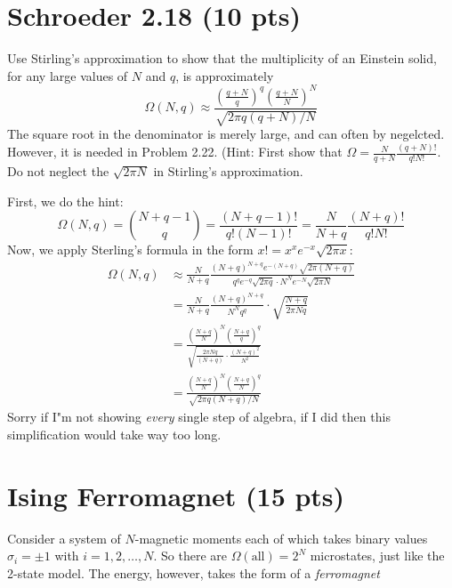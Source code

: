 \documentclass[10pt]{article}
\begin{document}
	\pagebreak

	\section*{Schroeder 2.18 (10 pts)}
	Use Stirling's approximation to show that the multiplicity of an Einstein solid, for any large values of $N$
	and $q$, is approximately
	\[
		\Omega(N, q) \approx \frac{\left( \frac{q + N}{q} \right)^q \left( \frac{q + N}{N} \right)^N}
		{\sqrt{2 \pi q(q + N) / N} }
	\] 
	The square root in the denominator is merely large, and can often by negelcted. However, it is needed 
	in Problem 2.22. (Hint: First show that $\Omega = \frac{N}{q + N}\frac{(q + N)!}{q! N!}$. Do not 
	neglect the $\sqrt{2\pi N} $ in Stirling's approximation.

	\begin{solution}
		First, we do the hint:
		\[
			\Omega(N, q) = {N + q - 1 \choose q} = \frac{(N + q - 1)!}{q!(N-1)!} = \frac{N}{N + q}
			\frac{(N + q)!}{q! N!}
		\] 
		Now, we apply Sterling's formula in the form $x! = x^xe^{-x}\sqrt{2\pi x}$:
		\begin{align*}
			\Omega(N, q) &\approx \frac{N}{N+q}\frac{(N + q)^{N + q} e^{-(N + q)} \sqrt{2 \pi (N + q)}}{q^q
			e^{-q} \sqrt{2 \pi q} \cdot N^N e^{-N} \sqrt{2 \pi N}} \\
						 &= \frac{N}{N + q} \frac{(N + q)^{N + q}}{N^N q^q} \cdot \sqrt{\frac{N + q}{2\pi Nq}} \\
						 &= \frac{\left( \frac{N + q}{N} \right)^N\left( \frac{N + q}{q} \right)^q}
						 {\sqrt{\frac{2 \pi Nq}{(N + q)} \cdot \frac{(N + q)^2}{N^2}}} \\
						 &= \frac{\left( \frac{N + q}{N} \right)^N\left( \frac{N + q}{N} \right)^q}
						 {\sqrt{2 \pi q(N + q) / N}}
		\end{align*}
		Sorry if I"m not showing \textit{every} single step of algebra, if I did then this simplification would
		take way too long.
	\end{solution}
	\pagebreak
	\section*{Ising Ferromagnet (15 pts)}

	Consider a system of $N$-magnetic moments each of which takes binary values $\sigma_i = \pm 1$ with 
	$i = 1, 2, \dots, N$. So there are $\Omega(\text{all}) = 2^N$ microstates, just like the 2-state model. 
	The energy, however, takes the form of a \textit{ferromagnet}
\end{document}
